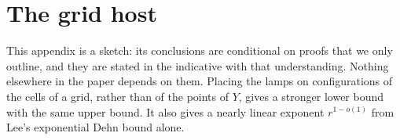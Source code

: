 \section{The grid host}\label{sec:grid}

This appendix is a sketch: its conclusions are conditional on proofs that we only outline, and they are stated in the indicative with that
understanding. Nothing elsewhere in the paper depends on them. Placing the lamps on configurations of the cells of a grid, rather than of the
points of $Y$, gives a stronger lower bound with the same upper bound. It also gives a nearly linear exponent $r^{1-o(1)}$ from Lee's
exponential Dehn bound alone.

